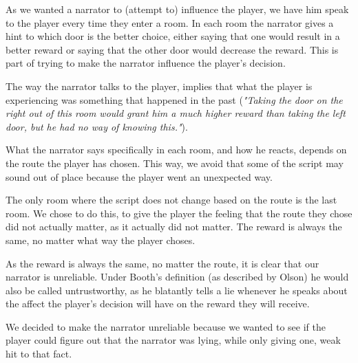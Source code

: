 As we wanted a narrator to (attempt to) influence the player, we have him speak to the player every time they enter a room. In each room the narrator gives a hint to which door is the better choice, either saying that one would result in a better reward or saying that the other door would decrease the reward. This is part of trying to make the narrator influence the player's decision. 

The way the narrator talks to the player, implies that what the player is experiencing was something that happened in the past (\textit{"Taking the door on the right out of this room would grant him a much higher reward than taking the left door, but he had no way of knowing this."}).

What the narrator says specifically in each room, and how he reacts, depends on the route the player has chosen. This way, we avoid that some of the script may sound out of place because the player went an unexpected way.

The only room where the script does not change based on the route is the last room. We chose to do this, to give the player the feeling that the route they chose did not actually matter, as it actually did not matter. The reward is always the same, no matter what way the player choses.

As the reward is always the same, no matter the route, it is clear that our narrator is unreliable. Under Booth's definition (as described by Olson\cite{Olson}) he would also be called untrustworthy, as he blatantly tells a lie whenever he speaks about the affect the player's decision will have on the reward they will receive.

We decided to make the narrator unreliable because we wanted to see if the player could figure out that the narrator was lying, while only giving one, weak hit to that fact.